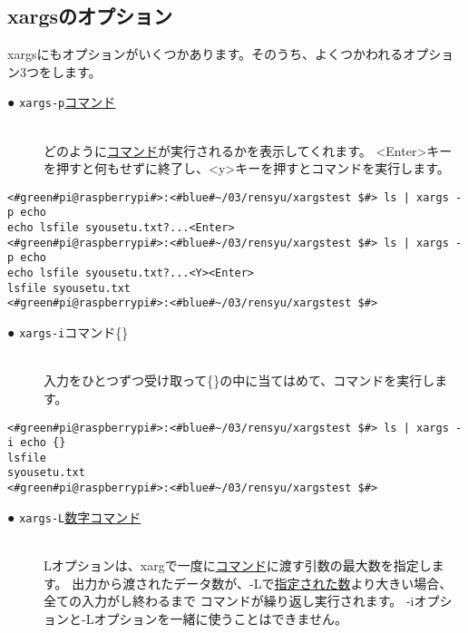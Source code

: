 \subsection{xargsのオプション}
xargsにもオプションがいくつかあります。そのうち、よくつかわれるオプション3つをします。

\begin{description}
    \item[● \texttt{xargs}\textvisiblespace \texttt{-p}\textvisiblespace \underline{コマンド}]\mbox{}\\
    どのように\underline{コマンド}が実行されるかを表示してくれます。
    <Enter>キーを押すと何もせずに終了し、<y>キーを押すとコマンドを実行します。
\end{description}

\begin{lstlisting}[caption=xargsコマンドのオプションp]
<#green#pi@raspberrypi#>:<#blue#~/03/rensyu/xargstest $#> ls | xargs -p echo
echo lsfile syousetu.txt?...<Enter>
<#green#pi@raspberrypi#>:<#blue#~/03/rensyu/xargstest $#> ls | xargs -p echo
echo lsfile syousetu.txt?...<Y><Enter>
lsfile syousetu.txt
<#green#pi@raspberrypi#>:<#blue#~/03/rensyu/xargstest $#>
\end{lstlisting}

\begin{description}
    \item[● \texttt{xargs}\textvisiblespace \texttt{-i}\textvisiblespace コマンド\textvisiblespace \{\}]\mbox{}\\
    入力をひとつずつ受け取って\{\}の中に当てはめて、コマンドを実行します。
\end{description}

\begin{lstlisting}[caption=xargsコマンドのオプションi]
<#green#pi@raspberrypi#>:<#blue#~/03/rensyu/xargstest $#> ls | xargs -i echo {}
lsfile
syousetu.txt
<#green#pi@raspberrypi#>:<#blue#~/03/rensyu/xargstest $#>
\end{lstlisting}

\begin{description}
    \item[● \texttt{xargs}\textvisiblespace \texttt{-L}\textvisiblespace\underline{数字}\textvisiblespace\underline{コマンド}]\mbox{}\\
    Lオプションは、xargで一度に\underline{コマンド}に渡す引数の最大数を指定します。
    出力から渡されたデータ数が、-Lで\underline{指定された数}より大きい場合、全ての入力がし終わるまで
    コマンドが繰り返し実行されます。
    -iオプションと-Lオプションを一緒に使うことはできません。
\end{description}

